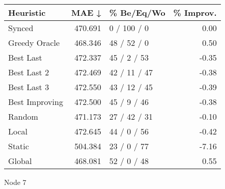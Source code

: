 \begin{tabular}{lrlr}
\toprule
\textbf{Heuristic} & \textbf{MAE ↓} & \textbf{\% Be/Eq/Wo} & \textbf{\% Improv.} \\
\midrule
            Synced &        470.691 &          0 / 100 / 0 &                0.00 \\
     Greedy Oracle &        468.346 &          48 / 52 / 0 &                0.50 \\
         Best Last &        472.337 &          45 / 2 / 53 &               -0.35 \\
       Best Last 2 &        472.469 &         42 / 11 / 47 &               -0.38 \\
       Best Last 3 &        472.550 &         43 / 12 / 45 &               -0.39 \\
    Best Improving &        472.500 &          45 / 9 / 46 &               -0.38 \\
            Random &        471.173 &         27 / 42 / 31 &               -0.10 \\
             Local &        472.645 &          44 / 0 / 56 &               -0.42 \\
            Static &        504.384 &          23 / 0 / 77 &               -7.16 \\
            Global &        468.081 &          52 / 0 / 48 &                0.55 \\
\bottomrule
\end{tabular}
\caption{Node 7}
\label{tab:non_lr05_le1_bs4_7}

